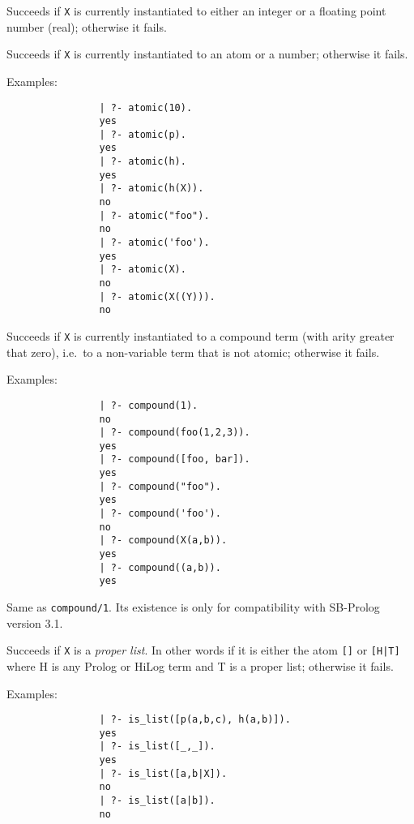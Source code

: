 \begin{description}
    Succeeds if {\tt X} is currently instantiated to either an integer or 
    a floating point number (real); otherwise it fails.

    Succeeds if {\tt X} is currently instantiated to an atom or a number;
    otherwise it fails.

    Examples:
    {\footnotesize
     \begin{verbatim}
                | ?- atomic(10).
                yes
                | ?- atomic(p).
                yes
                | ?- atomic(h).
                yes
                | ?- atomic(h(X)).
                no
                | ?- atomic("foo").
                no
                | ?- atomic('foo').
                yes
                | ?- atomic(X).
                no
                | ?- atomic(X((Y))).
                no
     \end{verbatim}}

    Succeeds if {\tt X} is currently instantiated to a compound term (with 
    arity greater that zero), i.e.\ to a non-variable term that is not atomic;
    otherwise it fails.

    Examples:
    {\footnotesize
     \begin{verbatim}
                | ?- compound(1).
                no
                | ?- compound(foo(1,2,3)).
                yes
                | ?- compound([foo, bar]).
                yes
                | ?- compound("foo").
                yes
                | ?- compound('foo').
                no
                | ?- compound(X(a,b)).
                yes
                | ?- compound((a,b)).
                yes	
     \end{verbatim}}

    Same as {\tt compound/1}\@. Its existence is only for compatibility 
    with SB-Prolog version 3.1.

    Succeeds if {\tt X} is a {\em proper list}. In other words if it is 
    either the atom {\tt []} or {\tt [H|T]} where H is any Prolog or HiLog
    term and T is a proper list; otherwise it fails.

    Examples:
    {\footnotesize
     \begin{verbatim}
                | ?- is_list([p(a,b,c), h(a,b)]).
                yes
                | ?- is_list([_,_]).
                yes
                | ?- is_list([a,b|X]).
                no
                | ?- is_list([a|b]).
                no
     \end{verbatim}}


\end{description}
